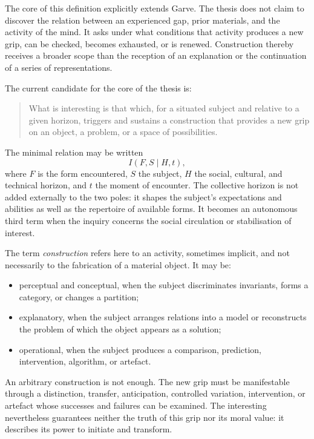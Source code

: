 \documentclass[11pt,a4paper]{article}
\begin{document}
The core of this definition explicitly extends Garve. The thesis does not claim
to discover the relation between an experienced gap, prior materials, and the
activity of the mind. It asks under what conditions that activity produces a
new grip, can be checked, becomes exhausted, or is renewed. Construction thereby
receives a broader scope than the reception of an explanation or the
continuation of a series of representations.

The current candidate for the core of the thesis is:

\begin{quote}
What is interesting is that which, for a situated subject and relative to a
given horizon, triggers and sustains a construction that provides a new grip on
an object, a problem, or a space of possibilities.
\end{quote}

The minimal relation may be written
\[
  I(F,S\mid H,t),
\]
where \(F\) is the form encountered, \(S\) the subject, \(H\) the social,
cultural, and technical horizon, and \(t\) the moment of encounter. The
collective horizon is not added externally to the two poles: it shapes the
subject's expectations and abilities as well as the repertoire of available
forms. It becomes an autonomous third term when the inquiry concerns the social
circulation or stabilisation of interest.

The term \emph{construction} refers here to an activity, sometimes implicit, and
not necessarily to the fabrication of a material object. It may be:

\begin{itemize}
  \item perceptual and conceptual, when the subject discriminates invariants,
        forms a category, or changes a partition;
  \item explanatory, when the subject arranges relations into a model or
        reconstructs the problem of which the object appears as a solution;
  \item operational, when the subject produces a comparison, prediction,
        intervention, algorithm, or artefact.
\end{itemize}

An arbitrary construction is not enough. The new grip must be manifestable
through a distinction, transfer, anticipation, controlled variation,
intervention, or artefact whose successes and failures can be examined. The
interesting nevertheless guarantees neither the truth of this grip nor its
moral value: it describes its power to initiate and transform.
\end{document}
